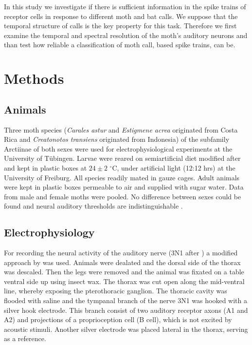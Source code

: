 \documentclass[12pt,a4paper,pdftex]{article}
\newcommand{\species}[1]{\textit{#1}}
\begin{document}
In this study we investigate if there is sufficient information in the spike trains of receptor cells in response to different moth and bat calls. We suppose that the temporal structure of calls is the key property for this task. Therefore we first examine the temporal and spectral resolution of the moth's auditory neurons and than test how reliable a classification of moth call, based spike trains, can be.
\newpage

\section*{Methods}
\subsection*{Animals}
Three moth species (\species{Carales astur} and \species{Estigmene acrea} originated from Costa Rica and \species{Creatonotos transiens} originated from Indonesia) of the subfamily Arctiinae of both sexes were used for electrophysiological experiments at the University of T{\"u}bingen. Larvae were reared on semiartificial diet modified after \cite{bergomaz1986} and kept in plastic boxes at $24\pm2$ $^{\circ}$C, under artificial light (12:12 hrs) at the University of Freiburg. All species readily mated in gauze cages. Adult animals were kept in plastic boxes permeable to air and supplied with sugar water. Data from male and female moths were pooled. No difference between sexes could be found and neural auditory thresholds are indistinguishable
\cite{terhofstede2013}.        

\subsection*{Electrophysiology}
For recording the neural activity of the auditory nerve (3N1 after \cite{nuesch1957}) a modified approach by \cite{roeder1957} was used. Animals were dealated and the dorsal side of the thorax was descaled. Then the legs were removed and the animal was fixated on a table ventral side up using insect wax. The thorax was cut open along the mid-ventral line, whereby exposing the pterothoracic ganglion. The thoracic cavity was flooded with saline and the tympanal branch of the nerve 3N1 was hooked with a silver hook electrode. This branch consist of two auditory receptor axons (A1 and A2) and projections of a proprioception cell (B cell), which is not excited by acoustic stimuli. Another silver electrode was placed lateral in the thorax, serving as a reference.   
\end{document}
